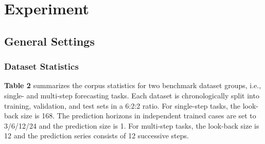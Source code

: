 \documentclass[final,12pt]{elsarticle}
\begin{document}
\section{Experiment}
\label{sec-5}


\subsection{General Settings}
\label{subsec-5.1}


\subsubsection{Dataset Statistics}
\label{subsubsec-5.1.1}


\textbf{Table 2} summarizes the corpus statistics 
for two benchmark dataset groups, 
i.e., single- and multi-step forecasting tasks.  %
Each dataset is chronologically split into 
training, validation, and test sets 
in a 6:2:2 ratio.  %
For single-step tasks, 
the look-back size is 168.
The prediction horizons in independent trained cases are set to 3/6/12/24 
and the prediction size is 1.  %
For multi-step tasks, 
the look-back size is 12 
and the prediction series consists of 12 successive steps.  %
\end{document}
